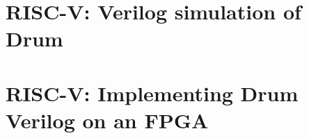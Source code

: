 \label{Sec_FSMs_Drum_verilator}


\section{RISC-V: Verilog simulation of Drum}

\label{Sec_FSMs_Drum_simulation}


\section{RISC-V: Implementing Drum Verilog on an FPGA}

\label{Sec_FSMs_Drum_FPGA}

